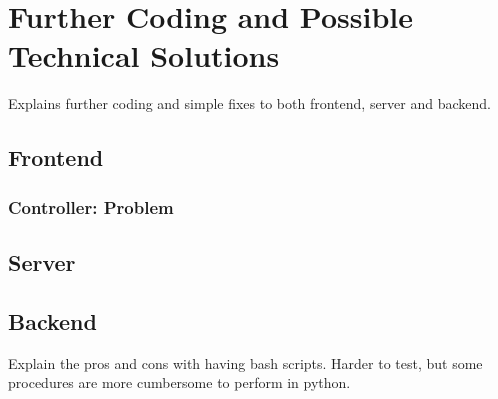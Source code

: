 \chapter{Further Coding and Possible Technical Solutions}
\label{apdx:backlog}

Explains further coding and simple fixes to both frontend, server and backend.

\section{Frontend}

\subsection{Controller: Problem}


\section{Server}

\section{Backend}
Explain the pros and cons with having bash scripts. Harder to test, but some procedures are more cumbersome to perform in python.
